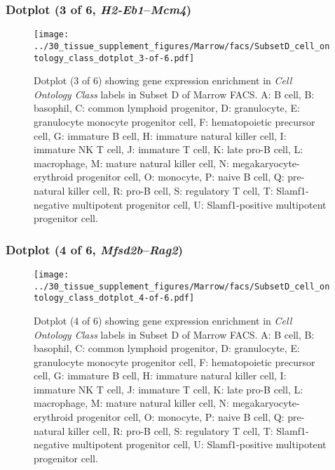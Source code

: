 \subsubsection{Dotplot (3 of 6, \emph{H2-Eb1}--\emph{Mcm4})}
\begin{figure}[h]
\centering
\texttt{[image: ../30\_tissue\_supplement\_figures/Marrow/facs/SubsetD\_cell\_ontology\_class\_dotplot\_3-of-6.pdf]}

\caption{ Dotplot (3 of 6)  showing gene expression enrichment in \emph{Cell Ontology Class} labels in Subset D of Marrow FACS. A: B cell, B: basophil, C: common lymphoid progenitor, D: granulocyte, E: granulocyte monocyte progenitor cell, F: hematopoietic precursor cell, G: immature B cell, H: immature natural killer cell, I: immature NK T cell, J: immature T cell, K: late pro-B cell, L: macrophage, M: mature natural killer cell, N: megakaryocyte-erythroid progenitor cell, O: monocyte, P: naive B cell, Q: pre-natural killer cell, R: pro-B cell, S: regulatory T cell, T: Slamf1-negative multipotent progenitor cell, U: Slamf1-positive multipotent progenitor cell.}
\end{figure}


\clearpage

\subsubsection{Dotplot (4 of 6, \emph{Mfsd2b}--\emph{Rag2})}
\begin{figure}[h]
\centering
\texttt{[image: ../30\_tissue\_supplement\_figures/Marrow/facs/SubsetD\_cell\_ontology\_class\_dotplot\_4-of-6.pdf]}

\caption{ Dotplot (4 of 6)  showing gene expression enrichment in \emph{Cell Ontology Class} labels in Subset D of Marrow FACS. A: B cell, B: basophil, C: common lymphoid progenitor, D: granulocyte, E: granulocyte monocyte progenitor cell, F: hematopoietic precursor cell, G: immature B cell, H: immature natural killer cell, I: immature NK T cell, J: immature T cell, K: late pro-B cell, L: macrophage, M: mature natural killer cell, N: megakaryocyte-erythroid progenitor cell, O: monocyte, P: naive B cell, Q: pre-natural killer cell, R: pro-B cell, S: regulatory T cell, T: Slamf1-negative multipotent progenitor cell, U: Slamf1-positive multipotent progenitor cell.}
\end{figure}


\clearpage

